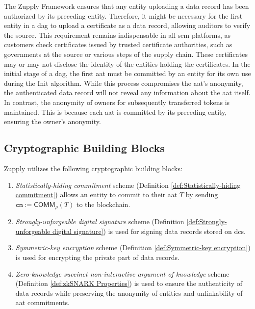 The Zupply Framework ensures that any entity uploading a data record has been authorized by its preceding entity. Therefore, it might be necessary for the first entity in a \gls{dag} to upload a certificate as a data record, allowing auditors to verify the source. This requirement remains indispensable in all \gls{scm} platforms, as customers check certificates issued by trusted certificate authorities, such as governments at the source or various steps of the supply chain. These certificates may or may not disclose the identity of the entities holding the certificates. In the initial stage of a \gls{dag}, the first \gls{aat} must be committed by an entity for its own use during the \textsf{Init} algorithm. While this process compromises the \gls{aat}'s anonymity, the authenticated data record will not reveal any information about the \gls{aat} itself. In contrast, the anonymity of owners for subsequently transferred tokens is maintained. This is because each \gls{aat} is committed by its preceding entity, ensuring the owner's anonymity. 


\subsection{Cryptographic Building Blocks}

Zupply utilizes the following cryptographic building blocks: 
\begin{enumerate}
    \item \textit{Statistically-hiding commitment} scheme (Definition \ref{def:Statistically-hiding commitment}) allows an entity to commit to their \gls{aat} $T$ by sending $\texttt{cm}:=\mathsf{COMM}_\rho(T)$ to the blockchain.

    \item \textit{Strongly-unforgeable digital signature} scheme (Definition \ref{def:Strongly-unforgeable digital signature}) is used for signing data records stored on \gls{dcs}.

    \item \textit{Symmetric-key encryption} scheme (Definition \ref{def:Symmetric-key encryption})  is used for encrypting the private part of data records.

    \item \textit{Zero-knowledge succinct non-interactive argument of knowledge} scheme (Definition \ref{def:zkSNARK Properties}) is used to ensure the authenticity of data records while preserving the anonymity of entities and unlinkability of \gls{aat} commitments.
\end{enumerate}


